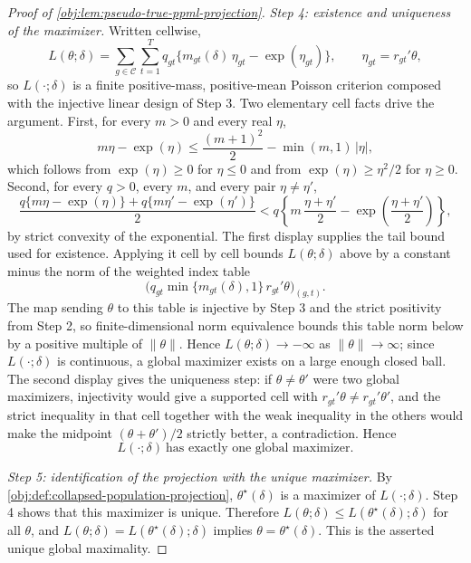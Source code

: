 \documentclass[11pt]{article}
\begin{document}
\begin{proof}[Proof of \cref{obj:lem:pseudo-true-ppml-projection}]
\textit{Step 4: existence and uniqueness of the maximizer.} Written cellwise,
\[
L(\theta;\delta)
=
\sum_{g\in\mathcal C}\sum_{t=1}^T
q_{gt}\bigl\{m_{gt}(\delta)\,\eta_{gt}-\exp(\eta_{gt})\bigr\},
\qquad
\eta_{gt}=r_{gt}'\theta ,
\]
so \(L(\cdot;\delta)\) is a finite positive-mass, positive-mean Poisson criterion composed with the injective linear design of Step 3.
Two elementary cell facts drive the argument. First, for every \(m>0\) and every real \(\eta\),
\[
m\eta-\exp(\eta)
\le
\frac{(m+1)^2}{2}-\min(m,1)\,|\eta| ,
\]
which follows from \(\exp(\eta)\ge0\) for \(\eta\le0\) and from \(\exp(\eta)\ge \eta^2/2\) for \(\eta\ge0\).
Second, for every \(q>0\), every \(m\), and every pair \(\eta\neq\eta'\),
\[
\frac{q\{m\eta-\exp(\eta)\}+q\{m\eta'-\exp(\eta')\}}{2}
<
q\left\{m\,\frac{\eta+\eta'}{2}-\exp\!\left(\frac{\eta+\eta'}{2}\right)\right\},
\]
by strict convexity of the exponential.
The first display supplies the tail bound used for existence. Applying it cell by cell bounds \(L(\theta;\delta)\) above by a constant minus the norm of the weighted index table
\[
\bigl(q_{gt}\min\{m_{gt}(\delta),1\}\,r_{gt}'\theta\bigr)_{(g,t)}.
\]
The map sending \(\theta\) to this table is injective by Step 3 and the strict positivity from Step 2, so finite-dimensional norm equivalence bounds this table norm below by a positive multiple of \(\|\theta\|\). Hence \(L(\theta;\delta)\to-\infty\) as \(\|\theta\|\to\infty\); since \(L(\cdot;\delta)\) is continuous, a global maximizer exists on a large enough closed ball. The second display gives the uniqueness step: if \(\theta\neq\theta'\) were two global maximizers, injectivity would give a supported cell with \(r_{gt}'\theta\neq r_{gt}'\theta'\), and the strict inequality in that cell together with the weak inequality in the others would make the midpoint \((\theta+\theta')/2\) strictly better, a contradiction. Hence
\[
L(\cdot;\delta)\ \text{has exactly one global maximizer.}
\]

\textit{Step 5: identification of the projection with the unique maximizer.} By \cref{obj:def:collapsed-population-projection}, \(\theta^\star(\delta)\) is a maximizer of \(L(\cdot;\delta)\). Step 4 shows that this maximizer is unique. Therefore \(L(\theta;\delta)\le L(\theta^\star(\delta);\delta)\) for all \(\theta\), and \(L(\theta;\delta)=L(\theta^\star(\delta);\delta)\) implies \(\theta=\theta^\star(\delta)\). This is the asserted unique global maximality.


\end{proof}
\end{document}
